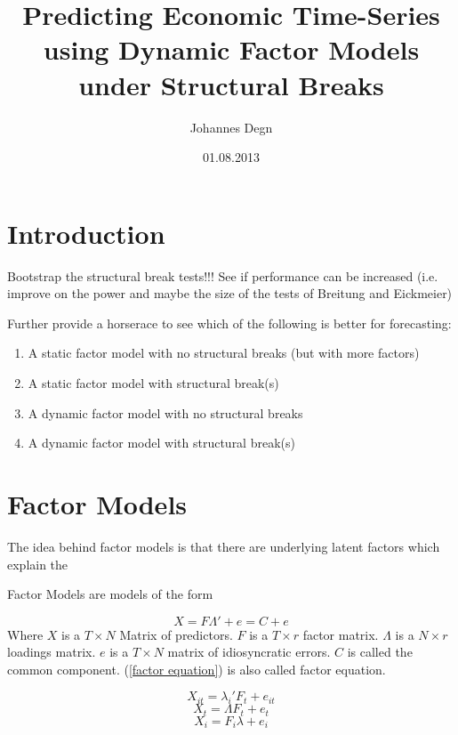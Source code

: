\documentclass[11pt]{article}
\title{\textbf{Predicting Economic Time-Series using Dynamic Factor Models under Structural Breaks}}
\author{Johannes Degn}
\date{01.08.2013}
\begin{document}
\maketitle

\tableofcontents

\section{Introduction}

Bootstrap the structural break tests!!! See if performance can be increased (i.e. improve on the power and maybe the size of the tests of Breitung and Eickmeier)

Further provide a horserace to see which of the following is better for forecasting:
\begin{enumerate}
	\item A static factor model with no structural breaks (but with more factors)
	\item A static factor model with structural break(s)
	\item A dynamic factor model with no structural breaks
	\item A dynamic factor model with structural break(s)
\end{enumerate}

\section{Factor Models}
The idea behind factor models is that there are underlying latent factors which explain the 

Factor Models are models of the form 

\begin{equation}
	\label{factor equation}
	X = F \Lambda' + e = C + e
\end{equation}
Where $X$ is a $T \times N$ Matrix of predictors. $F$ is a $T \times r$ factor matrix. $\Lambda$ is a $N \times r$ loadings matrix. $e$ is a $T \times N$ matrix of idiosyncratic errors. $C$ is called the common component. (\ref{factor equation}) is also called factor equation.




\begin{equation}
	\label{factor equation, it indexed}
	X_{it} = \lambda_i' F_t + e_{it}
\end{equation}
\begin{equation}
	\label{factor equation, t indexed}
	X_t = \Lambda F_t + e_t
\end{equation}
\begin{equation}
	\label{factor equation, i indexed}
	X_i = F_i \lambda + e_i
\end{equation}
\end{document}
